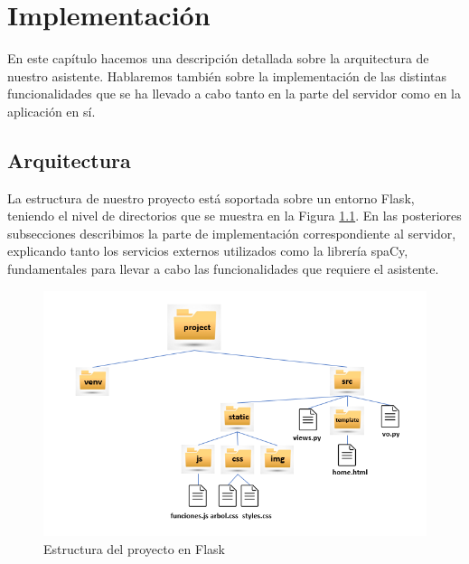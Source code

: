 \chapter{Implementación}
\label{cap:implementacion}



En este capítulo hacemos una descripción detallada sobre la arquitectura de nuestro asistente. Hablaremos también sobre la implementación de las distintas funcionalidades que se ha llevado a cabo tanto en la parte del servidor como en la aplicación en sí.


\section{Arquitectura}

La estructura de nuestro proyecto está soportada sobre un entorno Flask, teniendo el nivel de directorios que se muestra en la Figura \ref{fig:projectStructure}. En las posteriores subsecciones describimos la parte de implementación correspondiente al servidor, explicando tanto los servicios externos utilizados como la librería spaCy, fundamentales para llevar a cabo las funcionalidades que requiere el asistente.

	 \begin{figure}[h!]
	\centering
	
	
	\includegraphics[scale=1.2]{Imagenes/Figuras/Project-Structure}
	
	
	\caption{Estructura del proyecto en Flask}
	\label{fig:projectStructure}
\end{figure}

